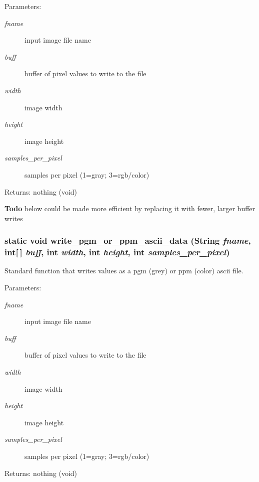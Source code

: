 \begin{Desc}
\item[Parameters:]
\begin{description}
\item[{\em fname}]input image file name \item[{\em buff}]buffer of pixel values to write to the file \item[{\em width}]image width \item[{\em height}]image height \item[{\em samples\_\-per\_\-pixel}]samples per pixel (1=gray; 3=rgb/color)\end{description}
\end{Desc}
\begin{Desc}
\item[Returns:]nothing (void)\end{Desc}
\begin{Desc}
\item[{\bf Todo}]below could be made more efficient by replacing it with fewer, larger buffer writes \end{Desc}
\subsubsection{\setlength{\rightskip}{0pt plus 5cm}static void write\_\-pgm\_\-or\_\-ppm\_\-ascii\_\-data (String {\em fname}, int[$\,$] {\em buff}, int {\em width}, int {\em height}, int {\em samples\_\-per\_\-pixel})\hspace{0.3cm}{\tt  [static]}}\label{class_c_s_image_viewer_1_1pnm_helper_3c2224c0966249ea2ff6c0981de771ee}


Standard function that writes values as a pgm (grey) or ppm (color) ascii file. 

\begin{Desc}
\item[Parameters:]
\begin{description}
\item[{\em fname}]input image file name \item[{\em buff}]buffer of pixel values to write to the file \item[{\em width}]image width \item[{\em height}]image height \item[{\em samples\_\-per\_\-pixel}]samples per pixel (1=gray; 3=rgb/color)\end{description}
\end{Desc}
\begin{Desc}
\item[Returns:]nothing (void) \end{Desc}
